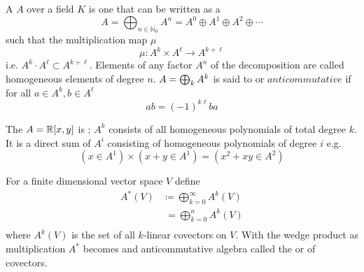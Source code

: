 \begin{definition}{}{}

A  \(A\) over a field \(K\) is one that can be written as a 
\[
     A=\bigoplus _{n\in \mathbb {N} _{0}}A^{n}=A^{0}\oplus A^{1}\oplus A^{2}\oplus \cdots 
\]
such that the multiplication map \(\mu\)
\[
    \mu \colon A^k \times A^\ell \rightarrow A^{k + \ell}    
\]
i.e. \(A^k\cdot A^\ell \subset A^{k+\ell}\). Elements of any factor \(A^n\) of the decomposition are called homogeneous elements of degree \(n\).
\(A = \bigoplus_k A^k\) is said to  or \(anticommutative\) if for all \(a\in A^k, b\in A^\ell\)
\[
ab = (-1)^{k\ell} ba
\]

\end{definition}

\begin{example}{}{}
    The 
    \(A=\mathbb{R}[x,y]\) is ; \(A^k\) consists of all homogeneous polynomials of total degree \(k\). It is a direct sum of \(A^{i}\) consisting of homogeneous polynomials of degree \(i\) e.g.
    \[
        \left( x \in A^1 \right)
        \times  
        \left( x+y \in A^1  \right) = 
        \left( x^2+xy \in A^2 \right) 
    \]
\end{example}

\begin{definition}{}{}
    For a finite dimensional vector space \(V\) define 
    \begin{equation}
        \begin{split}
            A^*(V) &\coloneqq \bigoplus_{k=0}^\infty A^k(V)  \\
            &\;= \bigoplus_{k=0}^n A^k(V) \\
        \end{split}
    \end{equation}
    where \(A^k(V)\) is the set of all \(k\)-linear covectors on \(V\).
    With the wedge product as multiplication \(A^*\) becomes and anticommutative algebra called the  or  of covectors.
\end{definition}

